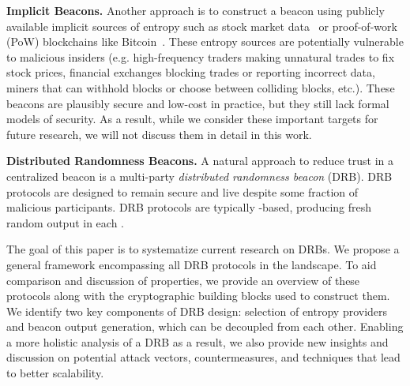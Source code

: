 \textbf{Implicit Beacons.} Another approach is to construct a beacon using publicly available implicit sources of entropy such as stock market data~\cite{clark2010use} or proof-of-work (PoW) blockchains like Bitcoin~\cite{nakamoto2008bitcoin, bentov2016bitcoin, bonneau2015bitcoin, han2020randchain}. These entropy sources are potentially vulnerable to malicious insiders (e.g. high-frequency traders making unnatural trades to fix stock prices, financial exchanges blocking trades or reporting incorrect data, miners that can withhold blocks or choose between colliding blocks, etc.). These beacons are plausibly secure and low-cost in practice, but they still lack formal models of security. As a result, while we consider these important targets for future research, we will not discuss them in detail in this work.

\textbf{Distributed Randomness Beacons.}
A natural approach to reduce trust in a centralized beacon is a multi-party \textit{distributed randomness beacon} (DRB). DRB protocols are designed to remain secure and live despite some fraction of malicious participants. %
DRB protocols are typically \epoch-based, producing fresh random output in each \epoch.

The goal of this paper is to systematize current research on DRBs. We propose a general framework encompassing all DRB protocols in the landscape. To aid comparison and discussion of properties, we provide an overview of these protocols along with the cryptographic building blocks used to construct them. We identify two key components of DRB design: selection of entropy providers and beacon output generation, which can be decoupled from each other. Enabling a more holistic analysis of a DRB as a result, we also provide new insights and discussion on potential attack vectors, countermeasures, and techniques that lead to better scalability.

